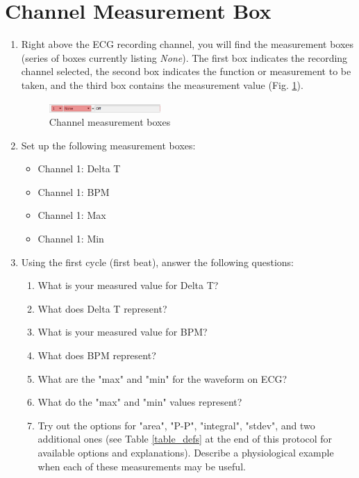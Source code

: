 \documentclass{article}
\begin{document}
\section*{Channel Measurement Box}
\begin{enumerate}
	\item Right above the ECG recording channel, you will find the measurement boxes (series of boxes currently listing \textit{None}). The first box indicates the recording channel selected, the second box indicates the function or measurement to be taken, and the third box contains the measurement value (Fig. \ref{meas_box}).
	
		\begin{figure}[h]
		\includegraphics[width=0.4\textwidth]{../images/BIOPAC_20.png}
		\centering
		\caption{Channel measurement boxes}
		\label{meas_box}
		\end{figure}
	\item Set up the following measurement boxes:\begin{itemize}
		\item Channel 1: Delta T
		\item Channel 1: BPM
		\item Channel 1: Max
		\item Channel 1: Min
	\end{itemize}
	\item Using the first cycle (first beat), answer the following questions:
		\begin{enumerate}
			\item What is your measured value for Delta T?
			\item What does Delta T represent?
			\item What is your measured value for BPM?
			\item What does BPM represent?
			\item What are the "max" and "min" for the waveform on ECG?
			\item What do the "max" and "min" values represent?
			\item Try out the options for "area", "P-P", "integral", "stdev", and two additional ones (see Table \ref{table_defs} at the end of this protocol for available options and explanations). Describe a physiological example when each of these measurements may be useful.
		\end{enumerate}
\end{enumerate}
\end{document}
